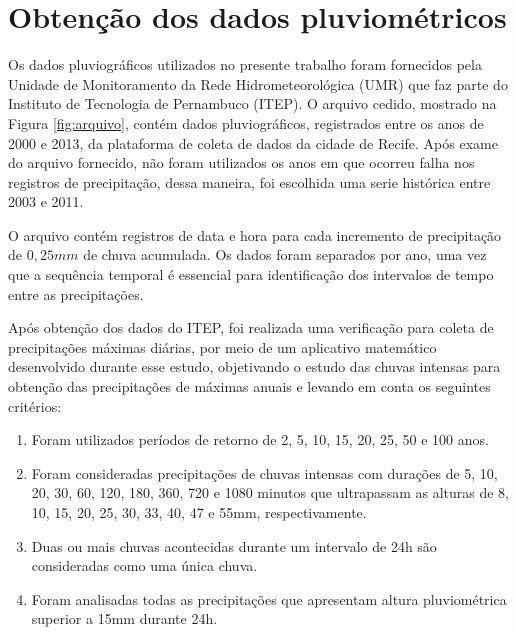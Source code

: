 \section{Obtenção dos dados pluviométricos}

Os dados pluviográficos utilizados no presente trabalho foram fornecidos pela Unidade de Monitoramento da Rede Hidrometeorológica (UMR) que faz parte do Instituto de Tecnologia de Pernambuco (ITEP). O arquivo cedido, mostrado na Figura \ref{fig:arquivo}, contém dados pluviográficos, registrados entre os anos de 2000 e 2013, da plataforma de coleta de dados da cidade de Recife. Após exame do arquivo fornecido, não foram utilizados os anos em que ocorreu falha nos registros de precipitação, dessa maneira, foi escolhida uma serie histórica entre 2003 e 2011.

O arquivo contém registros de data e hora para cada incremento de precipitação de $0,25mm$ de chuva acumulada. Os dados foram separados por ano, uma vez que a sequência temporal é essencial para identificação dos intervalos de tempo entre as precipitações.


Após obtenção dos dados do ITEP, foi realizada uma verificação para coleta de precipitações máximas diárias, por meio de um aplicativo matemático desenvolvido durante esse estudo, objetivando o estudo das chuvas intensas para obtenção das precipitações de máximas anuais e levando em conta os seguintes critérios:

\begin{enumerate}
    \item Foram utilizados períodos de retorno de 2, 5, 10, 15, 20, 25, 50 e 100 anos.
    \item Foram consideradas precipitações de chuvas intensas com durações de 5, 10, 20, 30, 60, 120, 180, 360, 720 e 1080 minutos que ultrapassam as alturas de 8, 10, 15, 20, 25, 30, 33, 40, 47 e 55mm, respectivamente.
    \item Duas ou mais chuvas acontecidas durante um intervalo de 24h são consideradas como uma única chuva.
    \item Foram analisadas todas as precipitações que apresentam altura pluviométrica superior a 15mm durante 24h.
\end{enumerate}

